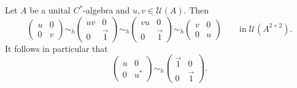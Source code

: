 \begin{lemma}[Whitehead]
Let $A$ be a unital $C^*$-algebra and $u,v\in\mathcal{U}(A)$. Then
\[ \begin{pmatrix}
u & 0 \\ 0 & v
\end{pmatrix} \sim_h \begin{pmatrix}
uv & 0 \\ 0 & \vec{1}
\end{pmatrix} \sim_h \begin{pmatrix}
vu & 0 \\ 0 & \vec{1}
\end{pmatrix} \sim_h \begin{pmatrix}
v & 0 \\ 0 & u
\end{pmatrix} \qquad \text{in}\;\mathcal{U}(A^{2\times 2}). \]
It follows in particular that
\[ \begin{pmatrix}
u & 0 \\ 0 & u^*
\end{pmatrix} \sim_h \begin{pmatrix}
\vec{1} & 0 \\ 0 & \vec{1}
\end{pmatrix}. \]
\end{lemma}
